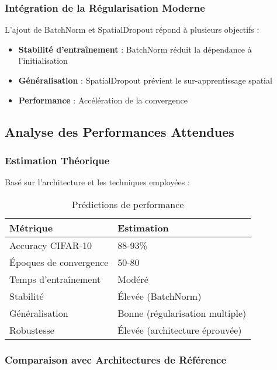 \documentclass[12pt,a4paper]{article}
\begin{document}
\subsubsection{Intégration de la Régularisation Moderne}

L'ajout de BatchNorm et SpatialDropout répond à plusieurs objectifs :
\begin{itemize}
    \item \textbf{Stabilité d'entraînement} : BatchNorm réduit la dépendance à l'initialisation
    \item \textbf{Généralisation} : SpatialDropout prévient le sur-apprentissage spatial
    \item \textbf{Performance} : Accélération de la convergence
\end{itemize}

\subsection{Analyse des Performances Attendues}

\subsubsection{Estimation Théorique}

Basé sur l'architecture et les techniques employées :

\begin{table}[H]
\centering
\caption{Prédictions de performance}
\begin{tabular}{ll}
\toprule
\textbf{Métrique} & \textbf{Estimation} \\
\midrule
Accuracy CIFAR-10 & 88-93\% \\
Époques de convergence & 50-80 \\
Temps d'entraînement & Modéré \\
Stabilité & Élevée (BatchNorm) \\
Généralisation & Bonne (régularisation multiple) \\
Robustesse & Élevée (architecture éprouvée) \\
\bottomrule
\end{tabular}
\end{table}

\subsubsection{Comparaison avec Architectures de Référence}
\end{document}
